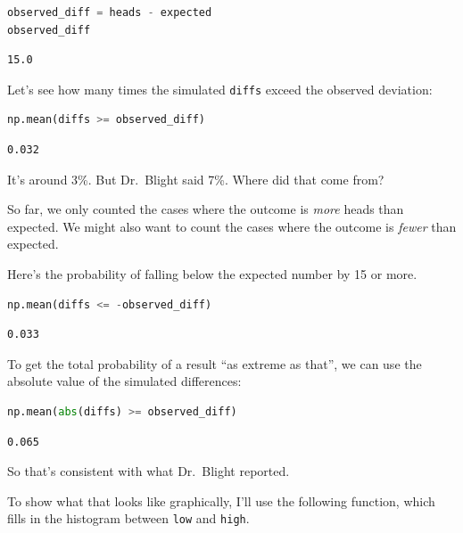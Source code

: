 \begin{lstlisting}[language=Python,style=source]
observed_diff = heads - expected
observed_diff
\end{lstlisting}

\begin{lstlisting}[style=output]
15.0
\end{lstlisting}

Let's see how many times the simulated \passthrough{\lstinline!diffs!}
exceed the observed deviation:

\begin{lstlisting}[language=Python,style=source]
np.mean(diffs >= observed_diff)
\end{lstlisting}

\begin{lstlisting}[style=output]
0.032
\end{lstlisting}

It's around 3\%. But Dr.~Blight said 7\%. Where did that come from?

So far, we only counted the cases where the outcome is \emph{more} heads
than expected. We might also want to count the cases where the outcome
is \emph{fewer} than expected.

Here's the probability of falling below the expected number by 15 or
more.

\begin{lstlisting}[language=Python,style=source]
np.mean(diffs <= -observed_diff)
\end{lstlisting}

\begin{lstlisting}[style=output]
0.033
\end{lstlisting}

To get the total probability of a result ``as extreme as that'', we can
use the absolute value of the simulated differences:

\begin{lstlisting}[language=Python,style=source]
np.mean(abs(diffs) >= observed_diff)
\end{lstlisting}

\begin{lstlisting}[style=output]
0.065
\end{lstlisting}

So that's consistent with what Dr.~Blight reported.

To show what that looks like graphically, I'll use the following
function, which fills in the histogram between
\passthrough{\lstinline!low!} and \passthrough{\lstinline!high!}.

